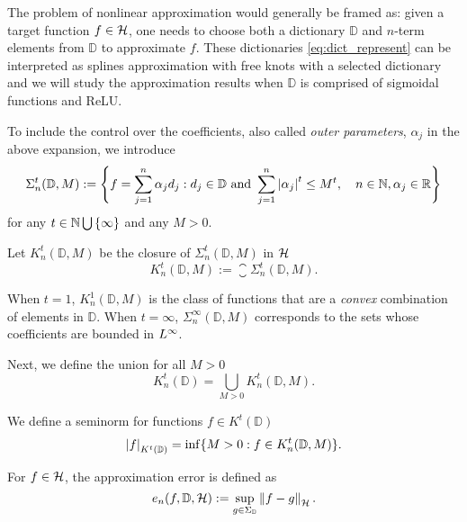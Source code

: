 The problem of nonlinear approximation would generally be framed as: given a
target function $f \in \mathcal{H}$, one needs to choose both a dictionary
$\mathbb{D}$ and $n$-term elements from $\mathbb{D}$ to approximate $f$. These
dictionaries \eqref{eq:dict_represent} can be interpreted as splines
approximation with free knots with a selected dictionary and we will study the
approximation results when $\mathbb{D}$ is comprised of sigmoidal functions and
ReLU.

To include the control over the coefficients, also called \textit{outer
parameters}, $\alpha_j$ in the above expansion, we introduce
\begin{equation}
    \label{eq:dict_sigma}
    \Sigma^{t}_n(\mathbb{D}, M) := \Bigg\{
        f = \sum_{j=1}^n \alpha_j d_j: 
        d_j \in \mathbb{D} \textnormal{ and } 
        \sum_{j=1}^n \left| \alpha_j \right|^t \leq M^t, \quad 
        n \in \mathbb{N}, \alpha_j \in \mathbb{R}
    \Bigg\}
\end{equation}
for any $t \in \mathbb{N} \bigcup\, \{\infty\}$ and any $M > 0$. 

Let $K^t_n(\mathbb{D}, M)$ be the closure of $\Sigma^t_n(\mathbb{D}, M)$ in
$\mathcal{H}$
\begin{equation}
    K^t_n(\mathbb{D}, M) := \closure{\Sigma^t_n(\mathbb{D}, M)}.
\end{equation}

When $t = 1$, $K^1_n(\mathbb{D}, M)$ is the class of functions that are a
\textit{convex} combination of elements in $\mathbb{D}$. When $t = \infty$,
$\Sigma^{\infty}_n(\mathbb{D}, M)$ corresponds to the sets whose coefficients
are bounded in $L^{\infty}$. 

Next, we define the union for all $M > 0$
\begin{equation}
    K^t_n(\mathbb{D}) = \bigcup_{M > 0} K^t_n(\mathbb{D}, M).
\end{equation}

We define a seminorm for functions $f \in K^t(\mathbb{D})$
\begin{equation}
    \label{eq:general_seminorm}
    \left| f \right|_{K^t(\mathbb{D})} = \inf \{
        M >0: f \in K^t_n(\mathbb{D}, M)
    \}.
\end{equation}

For $f \in \mathcal{H}$, the approximation error is defined as
\begin{equation}
    \label{eq:appro_err_hilbert}
    e_n(f, \mathbb{D}, \mathcal{H})
        := \sup_{g\in\Sigma_{\mathbb{D}}} \left\| f - g \right\|_{\mathcal{H}}.
\end{equation}

